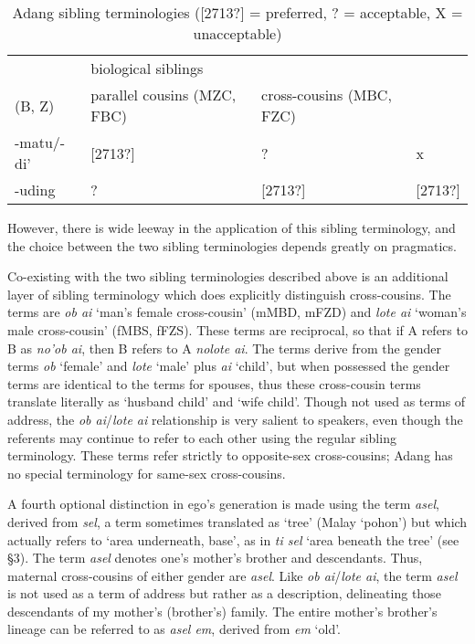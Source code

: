 \begin{table}


\begin{tabular}{llll}
& biological siblings \\
(B, Z)\par & parallel cousins (MZC, FBC)\par & cross-cousins (MBC, FZC)\par\\
{}-matu/-di' & [2713?]\par & ?\par & x\par\\
{}-uding & ?\par & [2713?]\par & [2713?]\par\\
\end{tabular}

\caption{Adang sibling terminologies ([2713?] = preferred, ? = acceptable, X = unacceptable)}
\end{table} %

However, there is wide leeway in the application of this sibling terminology, and the choice between the two sibling terminologies depends greatly on pragmatics.

Co-existing with the two sibling terminologies described above is an additional layer of sibling terminology which does explicitly distinguish cross-cousins. The terms are \textit{ob ai} `man's female cross-cousin' (mMBD, mFZD) and \textit{lote ai} `woman's male cross-cousin' (fMBS, fFZS). These terms are reciprocal, so that if A refers to B as \textit{no'ob ai}, then B refers to A \textit{nolote ai}. The terms derive from the gender terms \textit{ob} `female' and \textit{lote} `male' plus \textit{ai} `child', but when possessed the gender terms are identical to the terms for spouses, thus these cross-cousin terms translate literally as `husband child' and `wife child'. Though not used as terms of address, the \textit{ob ai}/\textit{lote ai} relationship is very salient to speakers, even though the referents may continue to refer to each other using the regular sibling terminology. These terms refer strictly to opposite-sex cross-cousins; Adang has no special terminology for same-sex cross-cousins.

A fourth optional distinction in ego's generation is made using the term \textit{asel}, derived from \textit{sel}, a term sometimes translated as `tree' (Malay `pohon') but which actually refers to `area underneath, base', as in \textit{ti sel } `area beneath the tree' (see {\S}3). The term \textit{asel} denotes one's mother's brother and descendants. Thus, maternal cross-cousins of either gender are \textit{asel}. Like \textit{ob ai}/\textit{lote ai}, the term \textit{asel} is not used as a term of address but rather as a description, delineating those descendants of my mother's (brother's) family. The entire mother's brother's lineage can be referred to as \textit{asel em}, derived from \textit{em} `old'.

